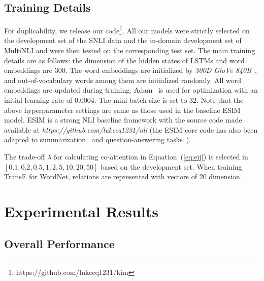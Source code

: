 \documentclass[11pt,a4paper]{article}
\begin{document}
\subsection{Training Details}
For duplicability, we release our code\footnote{https://github.com/lukecq1231/kim}. All our models were strictly selected on the development set of the SNLI data and the in-domain development set of MultiNLI and were then tested on the corresponding test set. The main training details are as follows: the dimension of the hidden states of LSTMs and word embeddings are $300$. The word embeddings are initialized by \textit{300D GloVe 840B}~\citep{DBLP:conf/emnlp/PenningtonSM14}, and out-of-vocabulary words among them are initialized randomly. All word embeddings are updated during training. Adam~\citep{DBLP:journals/corr/KingmaB14} is used for optimization with an initial learning rate of $0.0004$. The mini-batch size is set to $32$. Note that the above hyperparameter settings are same as those used in the baseline ESIM~\citep{DBLP:conf/acl/ChenZLWJI17} model. ESIM is a strong NLI baseline framework with the source code made available at \textit{https://github.com/lukecq1231/nli} (the ESIM core code has also been adapted to summarization~\citep{DBLP:conf/ijcai/ChenZLWJ16} and question-answering tasks~\citep{Zhang:qa:2017}). 

The trade-off $\lambda$ for calculating co-attention in Equation~(\ref{eq:eij}) is selected in $[0.1, 0.2, 0.5, 1, 2, 5, 10, 20, 50]$ based on the development set. When training TransE for WordNet, relations are represented with vectors of $20$ dimension.

\section{Experimental Results}
\label{sec:res}
\subsection{Overall Performance} 
\end{document}
